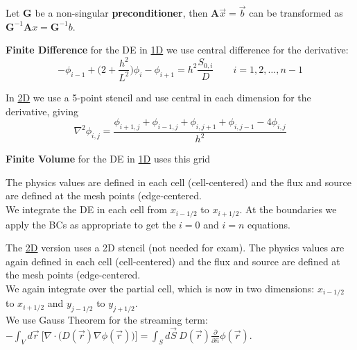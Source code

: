 \documentclass[12pt]{article}
\newcommand{\ve}[1]{\ensuremath{\mathbf{#1}}}
\begin{document}
Let $\ve{G}$ be a non-singular \textbf{preconditioner}, then $\ve{A}\vec{x}=\vec{b}$ can be transformed as $\ve{G}^{-1}\ve{A}x = \ve{G}^{-1}b$.

\textbf{Finite Difference} for the DE in \underline{1D} we use central difference for the derivative: 
\[-\phi_{i-1} + \bigl(2 + \frac{h^2}{L^2}\bigr)\phi_i - \phi_{i+1} = h^2 \frac{S_{0,i}}{D} \qquad i = 1, 2, \dots, n-1\]

In \underline{2D} we use a 5-point stencil and use central in each dimension for the derivative, giving
\[ \nabla^2 \phi_{i,j} = \frac{\phi_{i+1,j} + \phi_{i-1,j} + \phi_{i,j+1} + \phi_{i,j-1} - 4\phi_{i,j}}{h^2}\]


\textbf{Finite Volume} for the DE in \underline{1D} uses this grid 
%
\begin{multicols}{2}
\begin{center}
\end{center}
\columnbreak
The physics values are defined in each cell (cell-centered) and the flux and source are defined at the mesh points (edge-centered.\\
We integrate the DE in each cell from $x_{i-1/2}$ to $x_{i+1/2}$. At the boundaries we apply the BCs as appropriate to get the $i=0$ and $i=n$ equations.
\end{multicols}


The \underline{2D} version uses a 2D stencil (not needed for exam). The physics values are again defined in each cell (cell-centered) and the flux and source are defined at the mesh points (edge-centered.\\
We again integrate over the partial cell, which is now in two dimensions: $x_{i-1/2}$ to $x_{i+1/2}$ and $y_{j-1/2}$ to $y_{j+1/2}$.\\
We use Gauss Theorem for the streaming term: $-\int_V d\vec{r}\:\bigl[\nabla \cdot \bigl(D(\vec{r})\nabla \phi(\vec{r})\bigr)\bigr] = \int_S d\vec{S} \:D(\vec{r})\frac{\partial}{\partial \hat{n}}\phi(\vec{r})$.
\end{document}
